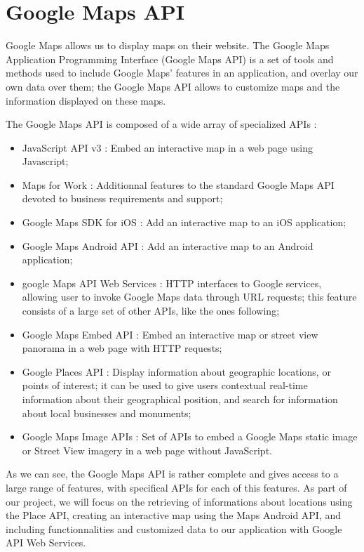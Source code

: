 \section{Google Maps API}

Google Maps allows us to display maps on their website. The Google Maps Application Programming Interface (Google Maps API) is a set of tools and methods used to include Google Maps' features in an application, and overlay our own data over them; the Google Maps API allows to customize maps and the information displayed on these maps.

The Google Maps API is composed of a wide array of specialized APIs :

\begin{itemize}
	\item JavaScript API v3 : Embed an interactive map in a web page using Javascript;
	\item Maps for Work : Additionnal features to the standard Google Maps API devoted to business requirements and support;
 	\item Google Maps SDK for iOS : Add an interactive map to an iOS application;
  	\item Google Maps Android API : Add an interactive map to an Android application;
	\item google Maps API Web Services : HTTP interfaces to Google services, allowing user to invoke Google Maps data through URL requests; this feature consists of a large set of other APIs, like the ones following;
	\item Google Maps Embed API : Embed an interactive map or street view panorama in a web page with HTTP requests;
 	\item Google Places API : Display information about geographic locations, or points of interest; it can be used to give users contextual real-time information about their geographical position, and search for information about local businesses and monuments;
 	\item Google Maps Image APIs : Set of APIs to embed a Google Maps static image or Street View imagery in a web page without JavaScript.
\end{itemize}

As we can see, the Google Maps API is rather complete and gives access to a large range of features, with specifical APIs for each of this features. As part of our project, we will focus on the retrieving of informations about locations using the Place API, creating an interactive map using the Maps Android API, and including functionnalities and customized data to our application with Google API Web Services.


